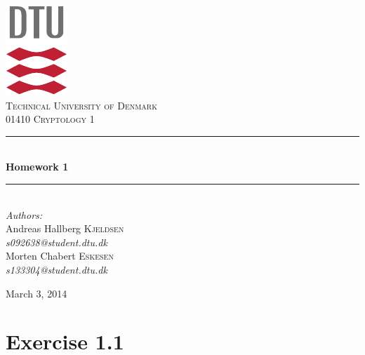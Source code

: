 \documentclass[11pt]{report}
\newcommand{\HRule}{\rule{\linewidth}{0.5mm}}
\begin{document}
\begin{titlepage}
\begin{center}

\includegraphics[scale=2.0]{../GFX/dtu_logo.pdf}\\[1cm]
\textsc{\LARGE Technical University of Denmark}\\[1.5cm]
\textsc{\Large 01410 Cryptology 1}\\[0.5cm]

\HRule \\[0.4cm]
{\huge \bfseries Homework 1}\\[0.1cm]
\HRule \\[1.5cm]

{\large
\emph{Authors:} \\[10pt]
Andreas Hallberg \textsc{Kjeldsen}\\
\emph{s092638@student.dtu.dk} \\[10pt]
Morten Chabert \textsc{Eskesen}\\
\emph{s133304@student.dtu.dk}
}
\vfill

{\large March 3, 2014}

\end{center}
\end{titlepage}

\section*{Exercise 1.1}
\end{document}
